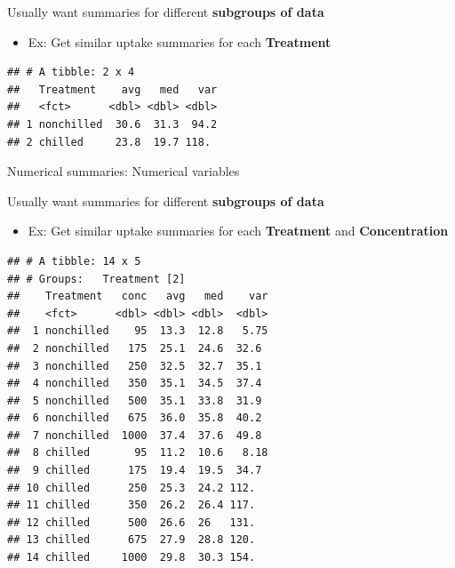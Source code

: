 \documentclass[
]{book}
\newenvironment{Shaded}{\begin{snugshade}}{\end{snugshade}}
\newcommand{\DataTypeTok}[1]{\textcolor[rgb]{0.13,0.29,0.53}{#1}}
\newcommand{\KeywordTok}[1]{\textcolor[rgb]{0.13,0.29,0.53}{\textbf{#1}}}
\newcommand{\NormalTok}[1]{#1}
\newcommand{\OperatorTok}[1]{\textcolor[rgb]{0.81,0.36,0.00}{\textbf{#1}}}
\newcommand{\StringTok}[1]{\textcolor[rgb]{0.31,0.60,0.02}{#1}}
\providecommand{\tightlist}{%
  \setlength{\itemsep}{0pt}\setlength{\parskip}{0pt}}
\theoremstyle{definition}
\theoremstyle{definition}
\theoremstyle{definition}
\theoremstyle{remark}
\begin{document}
Usually want summaries for different \textbf{subgroups of data}

\begin{itemize}
\tightlist
\item
  Ex: Get similar uptake summaries for each \textbf{Treatment}
\end{itemize}

\begin{Shaded}
\end{Shaded}

\begin{verbatim}
## # A tibble: 2 x 4
##   Treatment    avg   med   var
##   <fct>      <dbl> <dbl> <dbl>
## 1 nonchilled  30.6  31.3  94.2
## 2 chilled     23.8  19.7 118.
\end{verbatim}

Numerical summaries: Numerical variables

Usually want summaries for different \textbf{subgroups of data}

\begin{itemize}
\tightlist
\item
  Ex: Get similar uptake summaries for each \textbf{Treatment} and \textbf{Concentration}
\end{itemize}

\begin{Shaded}
\end{Shaded}

\begin{verbatim}
## # A tibble: 14 x 5
## # Groups:   Treatment [2]
##    Treatment   conc   avg   med    var
##    <fct>      <dbl> <dbl> <dbl>  <dbl>
##  1 nonchilled    95  13.3  12.8   5.75
##  2 nonchilled   175  25.1  24.6  32.6 
##  3 nonchilled   250  32.5  32.7  35.1 
##  4 nonchilled   350  35.1  34.5  37.4 
##  5 nonchilled   500  35.1  33.8  31.9 
##  6 nonchilled   675  36.0  35.8  40.2 
##  7 nonchilled  1000  37.4  37.6  49.8 
##  8 chilled       95  11.2  10.6   8.18
##  9 chilled      175  19.4  19.5  34.7 
## 10 chilled      250  25.3  24.2 112.  
## 11 chilled      350  26.2  26.4 117.  
## 12 chilled      500  26.6  26   131.  
## 13 chilled      675  27.9  28.8 120.  
## 14 chilled     1000  29.8  30.3 154.
\end{verbatim}
\end{document}
